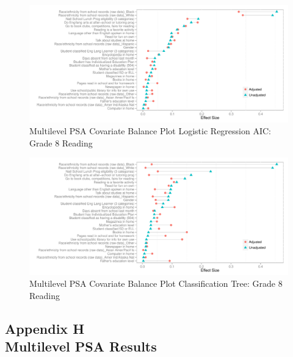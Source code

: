 \begin{figure}[h!]
\begin{center}
\includegraphics[width=\textwidth]{../Figures2009/g8read-mlpsa-lrAIC-balance.pdf}
\caption{Multilevel PSA Covariate Balance Plot Logistic Regression AIC: Grade 8 Reading}
\end{center}
\end{figure}

\begin{figure}[h!]
\begin{center}
\includegraphics[width=\textwidth]{../Figures2009/g8read-mlpsa-ctree-balance.pdf}
\caption{Multilevel PSA Covariate Balance Plot Classification Tree: Grade 8 Reading}
\end{center}
\end{figure}


\clearpage
{}
\subsection*{Appendix H\\Multilevel PSA Results}


